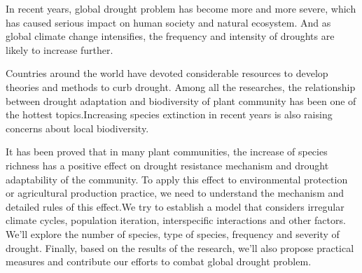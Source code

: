 \documentclass{mcmthesis}
\begin{document}
In recent years, global drought problem has become more and more severe, which has caused serious impact on human society and natural ecosystem. And as global climate change intensifies, the frequency and intensity of droughts are likely to increase further. 

Countries around the world have devoted considerable resources to develop theories and methods to curb drought. Among all the researches, the relationship between drought adaptation and biodiversity of plant community has been one of the hottest topics.Increasing species extinction in recent years is also raising concerns about local biodiversity. 

It has been proved that in many plant communities, the increase of species richness has a positive effect on drought resistance mechanism and drought adaptability of the community. To apply this effect to environmental protection or agricultural production practice, we need to understand the mechanism and detailed rules of this effect.We try to establish a model that considers irregular climate cycles, population iteration, interspecific interactions and other factors. We’ll explore the number of species, type of species, frequency and severity of drought. Finally, based on the results of the research, we’ll also propose practical measures and contribute our efforts to combat  global drought problem.


\end{document}
